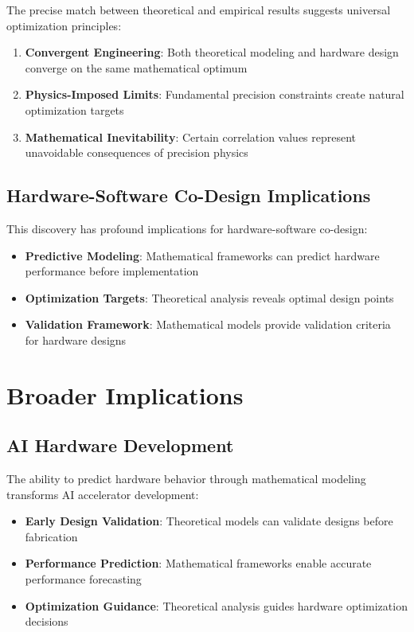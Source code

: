 \documentclass[conference]{IEEEtran}
\begin{document}
The precise match between theoretical and empirical results suggests universal optimization principles:

\begin{enumerate}
\item \textbf{Convergent Engineering}: Both theoretical modeling and hardware design converge on the same mathematical optimum
\item \textbf{Physics-Imposed Limits}: Fundamental precision constraints create natural optimization targets
\item \textbf{Mathematical Inevitability}: Certain correlation values represent unavoidable consequences of precision physics
\end{enumerate}

\subsection{Hardware-Software Co-Design Implications}

This discovery has profound implications for hardware-software co-design:

\begin{itemize}
\item \textbf{Predictive Modeling}: Mathematical frameworks can predict hardware performance before implementation
\item \textbf{Optimization Targets}: Theoretical analysis reveals optimal design points
\item \textbf{Validation Framework}: Mathematical models provide validation criteria for hardware designs
\end{itemize}

\section{Broader Implications}

\subsection{AI Hardware Development}

The ability to predict hardware behavior through mathematical modeling transforms AI accelerator development:

\begin{itemize}
\item \textbf{Early Design Validation}: Theoretical models can validate designs before fabrication
\item \textbf{Performance Prediction}: Mathematical frameworks enable accurate performance forecasting
\item \textbf{Optimization Guidance}: Theoretical analysis guides hardware optimization decisions
\end{itemize}
\end{document}
